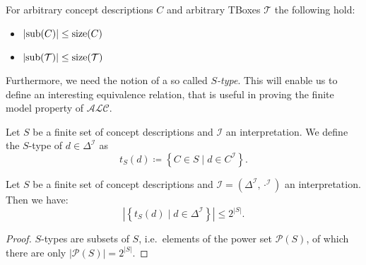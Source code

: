
\begin{lemma} \label{lem:card(sub)<=size}
	For arbitrary concept descriptions $C$ and arbitrary TBoxes $ \mathcal{T}$ the following hold:
	\begin{itemize}
		\item $\left| \operatorname{\text{sub}}(C) \right| \leq \operatorname{\text{size}}(C)$ 
		\item $\left| \operatorname{\text{sub}}(\mathcal{T}) \right| \leq \operatorname{\text{size}}(\mathcal{T})$
	\end{itemize}
\end{lemma}

Furthermore, we need the notion of a so called \textit{$S$-type}.
This will enable us to define an interesting equivalence relation, that is useful in proving the finite model property of $\mathcal{ALC}$.
\begin{definition}[$S$-type]
	Let $S$ be a finite set of concept descriptions and $\mathcal{I}$ an interpretation.
	We define the $S$-type of $d \in \Delta^{\mathcal{I}}$ as
	\[
		t_S(d) \coloneqq \left\{ C \in S \mid d \in C^{\mathcal{I}} \right\}
	.\]
\end{definition}

\begin{lemma}\label{lem:number of s-types}
	Let $S$ be a finite set of concept descriptions and $\mathcal{I} = (\Delta^{\mathcal{I}}, \cdot^{\mathcal{I}})$ an interpretation.
	Then we have:
	 \[
		 \left| \left\{ t_S(d) \mid d \in \Delta^{\mathcal{I}} \right\} \right| \leq 2^{\left| S \right|}
	.\]
\end{lemma}
\begin{proof}
	$S$-types are subsets of $S$, i.e.\ elements of the power set $\mathscr{P}(S)$,
	of which there are only $\lvert \mathscr{P}(S) \rvert = 2^{\lvert S \rvert}$.
\end{proof}

